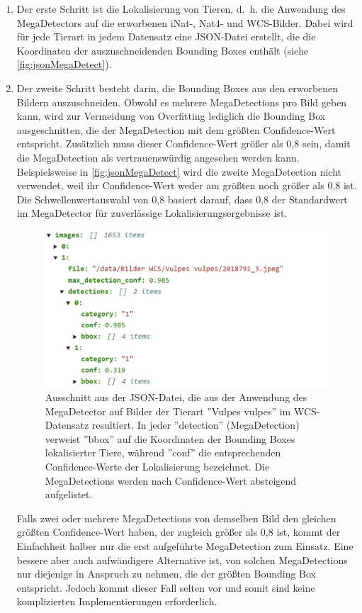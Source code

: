 \begin{enumerate}

	\item Der erste Schritt ist die Lokalisierung von Tieren, d.~h. die Anwendung des MegaDetectors auf die erworbenen iNat-, Nat4- und WCS-Bilder.	Dabei wird für jede Tierart in jedem Datensatz eine JSON-Datei erstellt, die die Koordinaten der auszuschneidenden Bounding Boxes enthält (siehe \autoref{fig:jsonMegaDetect}).
	
	\item Der zweite Schritt besteht darin, die Bounding Boxes aus den erworbenen Bildern auszuschneiden. Obwohl es mehrere MegaDetections pro Bild geben kann, wird zur Vermeidung von Overfitting lediglich die Bounding Box ausgeschnitten, die der MegaDetection mit dem größten Confidence-Wert entspricht. Zusätzlich muss dieser Confidence-Wert größer als 0,8 sein, damit die MegaDetection als vertrauenswürdig angesehen werden kann. Beispielsweise in \autoref{fig:jsonMegaDetect} wird die zweite MegaDetection nicht verwendet, weil ihr Confidence-Wert weder am größten noch größer als 0,8 ist. Die Schwellenwertauswahl von 0,8 basiert darauf, dass 0,8 der Standardwert im MegaDetector für zuverlässige Lokalisierungsergebnisse ist. 
	
	\begin{figure}[h]
		\centering
		\includegraphics[width=0.95\linewidth]{images/jsonMegaDetect}
		\caption{Ausschnitt aus der JSON-Datei, die aus der Anwendung des MegaDetector auf Bilder der Tierart ''Vulpes vulpes'' im WCS-Datensatz resultiert. In jeder ''detection'' (MegaDetection) verweist ''bbox'' auf die Koordinaten der Bounding Boxes lokalisierter Tiere, während ''conf'' die entsprechenden Confidence-Werte der Lokalisierung bezeichnet. Die MegaDetections werden nach Confidence-Wert absteigend aufgelistet.}
		\label{fig:jsonMegaDetect}
	\end{figure}
	
	Falls zwei oder mehrere MegaDetections von demselben Bild den gleichen größten Confidence-Wert haben, der zugleich größer als 0,8 ist, kommt der Einfachheit halber nur die erst aufgeführte MegaDetection zum Einsatz. Eine bessere aber auch aufwändigere Alternative ist, von solchen MegaDetections nur diejenige in Anspruch zu nehmen, die der größten Bounding Box entspricht. Jedoch kommt dieser Fall selten vor und somit sind keine komplizierten Implementierungen erforderlich.
\end{enumerate}


